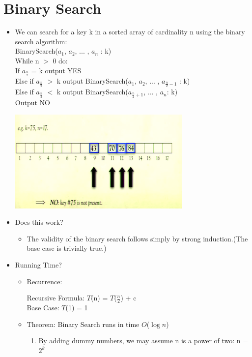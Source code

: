\documentclass[12pt]{article}
\begin{document}
\section{Binary Search}
\begin{itemize}
\item We can search for a key k in a sorted array of cardinality n using the binary search algorithm:\\
\large{
\noindent BinarySearch($a_1$, $a_2$, ... , $a_n$ : k)\\
\noindent While n $>$ 0 do: \\
		 If $a_{\frac{n}{2}}$ = k output YES\\
		 Else if $a_{\frac{n}{2}}$ $>$ k output BinarySearch($a_1$, $a_2$, ... , $a_{\frac{n}{2} - 			1}$ : k)\\
		Else if $a_{\frac{n}{2}}$ $<$ k output BinarySearch($a_{\frac{n}{2} + 1}$, ... , $a_n$: k)\\
		Output NO}
\begin{center}
\includegraphics{lecture2d}
\end{center}
\item Does this work?
	\begin{itemize}
	\item The validity of the binary search follows simply by strong induction.(The base case is 		trivially true.)
	\end{itemize}
\item Running Time?
	\begin{itemize}
	\item Recurrence: 
	\begin{center}
	\large{Recursive Formula: $T$(n) = $T$($\frac{n}{2}$) + c} \\
	\large{Base Case: $T$(1) = 1}
	\end{center}
	\item Theorem: Binary Search runs in time $O$($\log{}n$)
	\begin{enumerate}
	\item By adding dummy numbers, we may assume n is a power of two: n = 					$2^k$

\end{enumerate}
\end{itemize}
\end{itemize}
\end{document}
